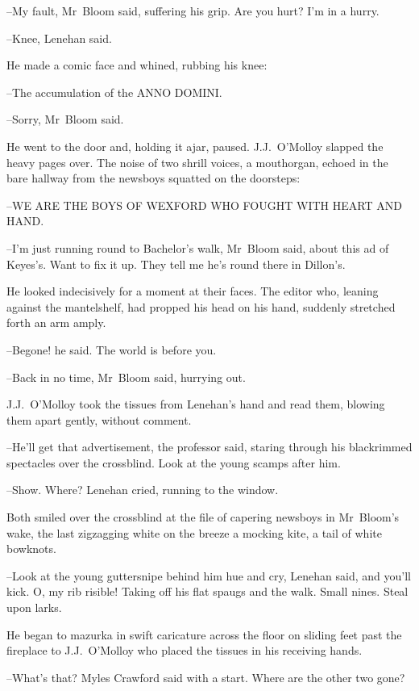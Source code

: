 --My fault,
Mr~Bloom said,
suffering his grip.
Are you hurt?
I'm in a hurry.

--Knee,
Lenehan said.

He made a comic face and whined,
rubbing his knee:

--The accumulation of the ANNO DOMINI.

--Sorry,
Mr~Bloom said.

He went to the door
and, holding it ajar,
paused.
J.J.~O'Molloy slapped the heavy pages over.
The noise of two shrill voices,
a mouthorgan,
echoed in the bare hallway
from the newsboys squatted on the doorsteps:


  --WE ARE THE BOYS OF WEXFORD
    WHO FOUGHT WITH HEART AND HAND.



--I'm just running round to Bachelor's walk,
Mr~Bloom said,
about this ad of Keyes's.
Want to fix it up.
They tell me he's round there in Dillon's.

He looked indecisively for a moment at their faces.
The editor
who, leaning against the mantelshelf,
had propped his head on his hand,
suddenly stretched forth an arm amply.

--Begone!
he said.
The world is before you.

--Back in no time,
Mr~Bloom said,
hurrying out.

J.J.~O'Molloy took the tissues from Lenehan's hand
and read them,
blowing them apart gently,
without comment.

--He'll get that advertisement,
the professor said,
staring through his
blackrimmed spectacles over the crossblind.
Look at the young scamps after him.

--Show.
Where?
Lenehan cried,
running to the window.



Both smiled over the crossblind
at the file of capering newsboys in Mr~Bloom's wake,
the last zigzagging white on the breeze a mocking kite,
a tail of white bowknots.

--Look at the young guttersnipe behind him
hue and cry,
Lenehan said,
and you'll kick.
O, my rib risible!
Taking off his flat spaugs and the walk.
Small nines.
Steal upon larks.

He began to mazurka in swift caricature across the floor
on sliding feet past the fireplace to J.J.~O'Molloy
who placed the tissues in his receiving hands.

--What's that?
Myles Crawford said
with a start.
Where are the other two gone?

